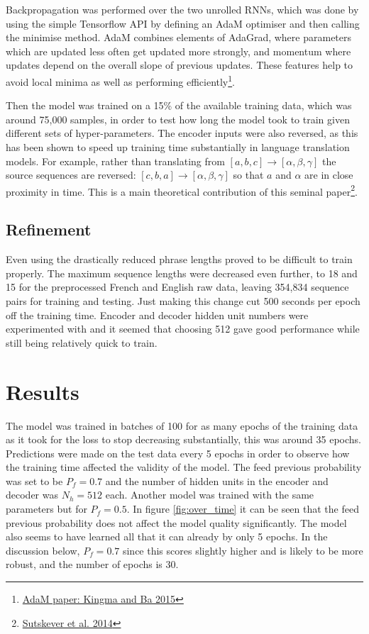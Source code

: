 \documentclass[]{article}
\begin{document}
Backpropagation was performed over the two unrolled RNNs, which was done by using the simple Tensorflow API by defining an AdaM optimiser and then calling the minimise method. AdaM combines elements of AdaGrad, where parameters which are updated less often get updated more strongly, and momentum where updates depend on the overall slope of previous updates. These features help to avoid local minima as well as performing efficiently\footnote{\href{https://arxiv.org/pdf/1412.6980v8.pdf}{AdaM paper:  Kingma and Ba 2015}}.
\iffalse
\texttt{[image: "C:/Users/mbcxrhm2/Dropbox/PhD/1st year/DrivenTLS/Images/alpha\_ph Dep/Populations/a0p01\_T6000".png]}
![seq2seq at training time](pictures/1-seq2seq.png)
\fi

Then the model was trained on a 15\% of the available training data, which was around 75,000 samples, in order to test how long the model took to train given different sets of hyper-parameters. The encoder inputs were also reversed, as this has been shown to speed up training time substantially in language translation models. For example, rather than translating from $[a, b, c] \to [\alpha, \beta, \gamma]$ the source sequences are reversed: $[c, b, a] \to [\alpha, \beta, \gamma]$ so that $a$ and $\alpha$ are in close proximity in time. This is a main theoretical contribution of this seminal paper\footnote{\href{https://papers.nips.cc/paper/5346-sequence-to-sequence-learning-with-neural-networks.pdf}{Sutskever et al. 2014}}.
\subsection{Refinement}
Even using the drastically reduced phrase lengths proved to be difficult to train properly. The maximum sequence lengths were decreased even further, to 18 and 15 for the preprocessed French and English raw data, leaving 354,834 sequence pairs for training and testing. Just making this change cut 500 seconds per epoch off the training time. Encoder and decoder hidden unit numbers were experimented with and it seemed that choosing 512 gave good performance while still being relatively quick to train.
\section{Results}
The model was trained in batches of 100 for as many epochs of the training data as it took for the loss to stop decreasing substantially, this was around 35 epochs. Predictions were made on the test data every 5 epochs in order to observe how the training time affected the validity of the model. The feed previous probability was set to be $P_f=0.7$ and the number of hidden units in the encoder and decoder was $N_h=512$ each. Another model was trained with the same parameters but for $P_f=0.5$. In figure \ref{fig:over_time} it can be seen that the feed previous probability does not affect the model quality significantly. The model also seems to have learned all that it can already by only 5 epochs. In the discussion below, $P_f=0.7$ since this scores slightly higher and is likely to be more robust, and the number of epochs is 30.
\end{document}
